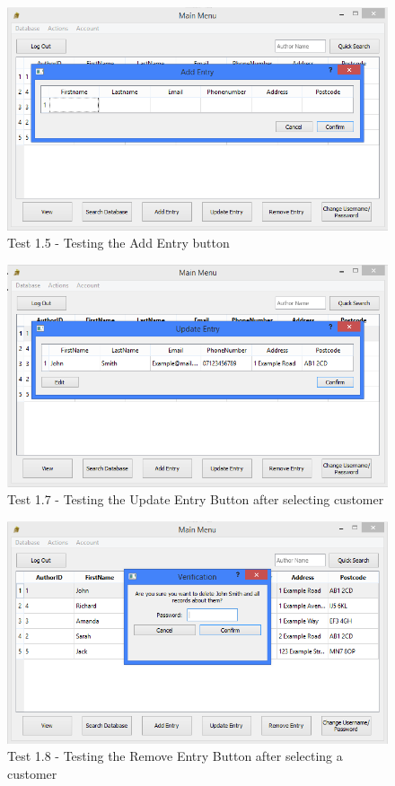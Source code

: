 \begin{landscape}
\begin{figure}[H]
    \includegraphics[width=\textwidth]{./Testing/Evidence/AddEntryButtonTest.png}
    \caption{Test 1.5 - Testing the Add Entry button}  \label{fig:AddEntryButtonTest}
\end{figure}

\begin{figure}[H]
    \includegraphics[width=\textwidth]{./Testing/Evidence/UpdateEntryButtonTest.png}
    \caption{Test 1.7 - Testing the Update Entry Button after selecting customer}  \label{fig:UpdateEntryButtonTest}
\end{figure}

\begin{figure}[H]
    \includegraphics[width=\textwidth]{./Testing/Evidence/RemoveEntryButtonTest.png}
    \caption{Test 1.8 - Testing the Remove Entry Button after selecting a customer}  \label{fig:RemoveEntryButtonTest}
\end{figure}


\end{landscape}
